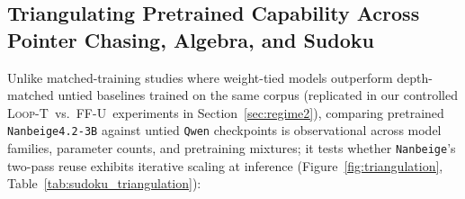 \documentclass[10pt,letterpaper]{article}
\newcommand{\LoopT}{\textsc{Loop-T}}
\newcommand{\FFU}{\textsc{FF-U}}
\begin{document}
\subsection{Triangulating Pretrained Capability Across Pointer Chasing, Algebra, and Sudoku}

Unlike matched-training studies where weight-tied models outperform depth-matched untied baselines trained on the same corpus \cite{sesodia2026inside} (replicated in our controlled \LoopT\ vs.\ \FFU\ experiments in Section~\ref{sec:regime2}), comparing pretrained \texttt{Nanbeige4.2-3B} against untied \texttt{Qwen} checkpoints is observational across model families, parameter counts, and pretraining mixtures; it tests whether \texttt{Nanbeige}'s two-pass reuse exhibits iterative scaling at inference (Figure~\ref{fig:triangulation}, Table~\ref{tab:sudoku_triangulation}):
\end{document}
